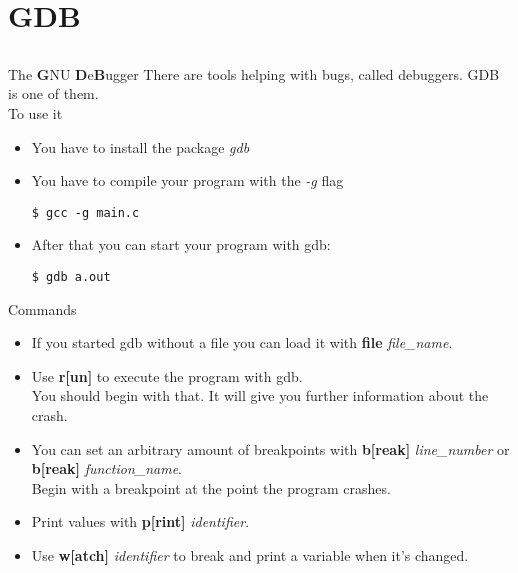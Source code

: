 \section{GDB}
\subsection{}
\begin{frame}[fragile = singleslide]{The \textbf{G}NU \textbf{D}e\textbf{B}ugger}
	There are tools helping with bugs, called debuggers. GDB is one of them.\\
	\bigskip
	To use it
	\begin{itemize}
		\item You have to install the package \textit{gdb}\\
		\item You have to compile your program with the \textit{-g} flag
		\begin{lstlisting}[numbers=none]
$ gcc -g main.c
\end{lstlisting}
		\item After that you can start your program with gdb:
		\begin{lstlisting}[numbers=none]
$ gdb a.out
\end{lstlisting}
	\end{itemize}
\end{frame}
\begin{frame}{Commands}
	\begin{itemize}
		\item If you started gdb without a file you can load it with \textbf{file} \textit{file\_name}.
		\item Use \textbf{r[un]} to execute the program with gdb.\\
		You should begin with that. It will give you further information about the crash.
		\item You can set an arbitrary amount of breakpoints with \textbf{b[reak]} \textit{line\_number} or \textbf{b[reak]} \textit{function\_name}.\\
		Begin with a breakpoint at the point the program crashes.
		\item Print values with \textbf{p[rint]} \textit{identifier}.
		\item Use \textbf{w[atch]} \textit{identifier} to break and print a variable when it's changed.
	\end{itemize}
\end{frame}
